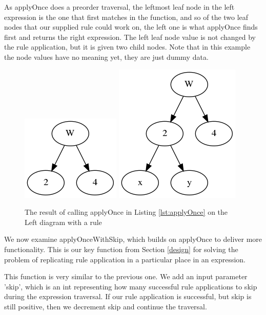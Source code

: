 \documentclass{l4proj}
\begin{document}
As applyOnce does a preorder traversal, the leftmost leaf node in the left expression is the one that first matches in the function, and so of the two leaf nodes that our supplied rule could work on, the left one is what applyOnce finds first and returns the right expression. The left leaf node value is not changed by the rule application, but it is given two child nodes. Note that in this example the node values have no meaning yet, they are just dummy data.

\begin{figure} 
    \centering
    \includegraphics[scale=0.5]{images/Section5applyOnce0}
    \hspace{2cm}
    \includegraphics[scale=0.5]{images/Section5applyOnce1}
    \caption{The result of calling applyOnce in Listing \ref{lst:applyOnce} on the Left diagram with a rule }
    \label{fig:applyOnce}
\end{figure}




We now examine applyOnceWithSkip, which builds on applyOnce to deliver more functionality.
This is our key function from Section \ref{design} for solving the problem of replicating rule application in a particular place in an expression.


This function is very similar to the previous one. We add an input parameter 'skip', which is an int representing how many successful rule applications to skip during the expression traversal. If our rule application is successful, but skip is still positive, then we decrement skip and continue the traversal.
\end{document}
